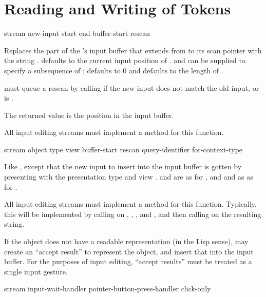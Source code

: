 \section {Reading and Writing of Tokens}

 {stream new-input 
                             \key start end buffer-start rescan}

Replaces the part of the  's input buffer
that extends from  to its scan pointer with the string
.   defaults to the current input position of
.   and  can be supplied to specify a
subsequence of ;  defaults to 0 and  defaults
to the length of .

 must queue a rescan by calling  if the new
input does not match the old input, or  is .

The returned value is the position in the input buffer.

All input editing streams must implement a method for this function.

 {stream object type view
                                          \key buffer-start rescan 
                                               query-identifier for-context-type}

Like , except that the new input to insert into the input
buffer is gotten by presenting  with the presentation type
 and view .  and  are as for
, and  and  as as
for .

All input editing streams must implement a method for this function.  Typically,
this will be implemented by calling  on ,
, , and , and then calling
 on the resulting string.

If the object does not have a readable representation (in the Lisp sense),
 may create an ``accept result'' to represent the
object, and insert that into the input buffer.  For the purposes of input
editing, ``accept results'' must be treated as a single input gesture.


 {stream \key input-wait-handler pointer-button-press-handler click-only}

